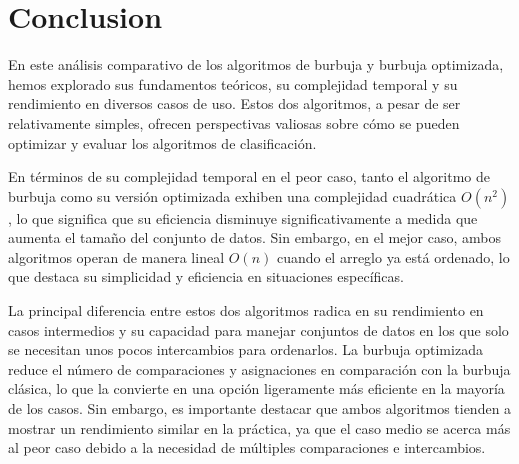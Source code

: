 \documentclass[journal]{IEEEtran}
\begin{document}
\section{Conclusion}
En este análisis comparativo de los algoritmos de 
burbuja y burbuja optimizada, hemos explorado sus 
fundamentos teóricos, su complejidad temporal y su 
rendimiento en diversos casos de uso. Estos dos 
algoritmos, a pesar de ser relativamente simples, 
ofrecen perspectivas valiosas sobre cómo se pueden 
optimizar y evaluar los algoritmos de clasificación.

En términos de su complejidad temporal en el peor caso, 
tanto el algoritmo de burbuja como su versión optimizada 
exhiben una complejidad cuadrática $O(n^{2})$, lo que significa 
que su eficiencia disminuye significativamente a medida 
que aumenta el tamaño del conjunto de datos. Sin embargo, 
en el mejor caso, ambos algoritmos operan de manera lineal 
$O(n)$ cuando el arreglo ya está ordenado, lo que destaca su 
simplicidad y eficiencia en situaciones específicas.

La principal diferencia entre estos dos algoritmos radica 
en su rendimiento en casos intermedios y su capacidad para 
manejar conjuntos de datos en los que solo se necesitan
 unos pocos intercambios para ordenarlos. La burbuja optimizada
  reduce el número de comparaciones y asignaciones en 
  comparación con la burbuja clásica, lo que la convierte 
  en una opción ligeramente más eficiente en la mayoría de 
  los casos. Sin embargo, es importante destacar que ambos 
  algoritmos tienden a mostrar un rendimiento similar en la 
  práctica, ya que el caso medio se acerca más al peor caso
   debido a la necesidad de múltiples comparaciones e 
   intercambios.

\end{document}
